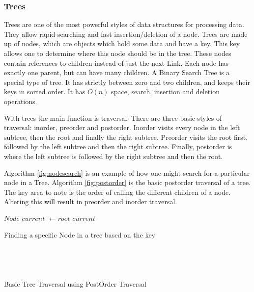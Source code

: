 \documentclass[conference]{IEEEtran}
\begin{document}
	\subsubsection{Trees}
	Trees are one of the most powerful styles of data structures for processing data. They allow rapid searching and fast insertion/deletion of a node. Trees are made up of nodes, which are objects which hold some data and have a key. This key allows one to determine where this node should be in the tree. These nodes contain references to children instead of just the next Link. Each node has exactly one parent, but can have many children. A Binary Search Tree is a special type of tree. It has strictly between zero and two children, and keeps their keys in sorted order. It has $O(n)$ space, search, insertion and deletion operations. 
	\par With trees the main function is traversal. There are three basic styles of traversal: inorder, preorder and postorder. Inorder visits every node in the left subtree, then the root and finally the right subtree. Preorder visits the root first, followed by the left subtree and then the right subtree. Finally, postorder is where the left subtree is followed by the right subtree and then the root. 
\par Algorithm \ref{fig:nodesearch} is an example of how one might search for a particular node in a Tree. Algorithm \ref{fig:postorder} is the basic postorder traversal of a tree. The key area to note is the order of calling the different children of a node. Altering this will result in preorder and inorder traversal.
\IncMargin{1em}
\begin{algorithm}
	\LinesNumbered
	$Node$ $current$ $\longleftarrow root$\;
\Return $current$\;
\caption{Finding a specific Node in a tree based on the key}
\label{fig:nodesearch}
\end{algorithm}\DecMargin{1em}
\\
\IncMargin{1em}
\begin{algorithm}
\SetAlgoNoLine
\LinesNumbered
	\Indm{}\\
\caption{Basic Tree Traversal using PostOrder Traversal}
\label{fig:postorder}
\end{algorithm}\DecMargin{1em}
\end{document}
